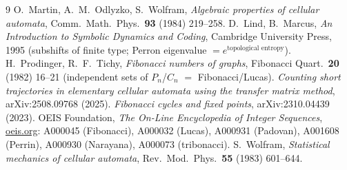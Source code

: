 \documentclass[11pt]{article}
\begin{document}
\begin{thebibliography}{9}
 O.~Martin, A.~M.~Odlyzko, S.~Wolfram,
\emph{Algebraic properties of cellular automata},
Comm.\ Math.\ Phys.\ \textbf{93} (1984) 219--258.
 D.~Lind, B.~Marcus,
\emph{An Introduction to Symbolic Dynamics and Coding},
Cambridge University Press, 1995 (subshifts of finite type; Perron eigenvalue
$=e^{\text{topological entropy}}$).
 H.~Prodinger, R.~F.~Tichy,
\emph{Fibonacci numbers of graphs},
Fibonacci Quart.\ \textbf{20} (1982) 16--21 (independent sets of $P_n$/$C_n$
$=$ Fibonacci/Lucas).
 \emph{Counting short trajectories in elementary
cellular automata using the transfer matrix method}, arXiv:2508.09768 (2025).
 \emph{Fibonacci cycles and fixed points}, arXiv:2310.04439
(2023).
 OEIS Foundation, \emph{The On-Line Encyclopedia of Integer
Sequences}, \href{https://oeis.org}{oeis.org}: A000045 (Fibonacci), A000032
(Lucas), A000931 (Padovan), A001608 (Perrin), A000930 (Narayana), A000073
(tribonacci).
 S.~Wolfram, \emph{Statistical mechanics of cellular automata},
Rev.\ Mod.\ Phys.\ \textbf{55} (1983) 601--644.
\end{thebibliography}
\end{document}
